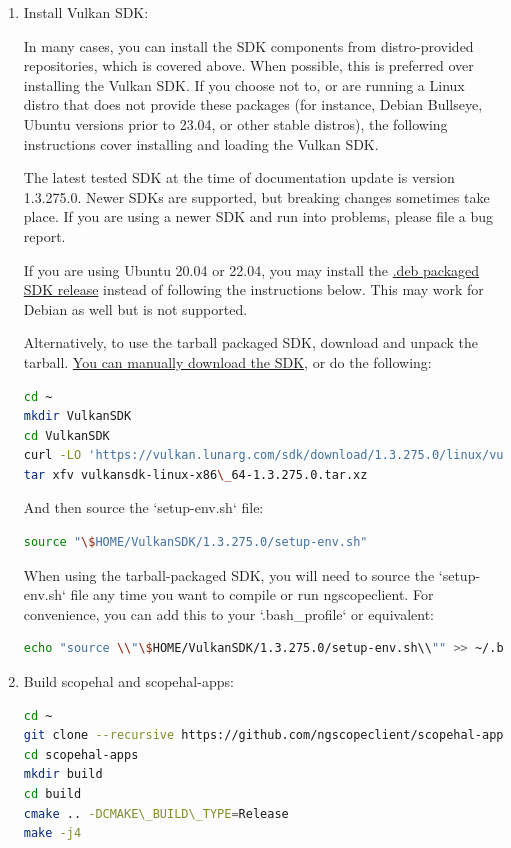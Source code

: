 \begin{enumerate}
\item Install Vulkan SDK:

In many cases, you can install the SDK components from distro-provided repositories, which is covered above. When
possible, this is preferred over installing the Vulkan SDK. If you choose not to, or are running a Linux distro that
does not provide these packages (for instance, Debian Bullseye, Ubuntu versions prior to 23.04, or other stable
distros), the following instructions cover installing and loading the Vulkan SDK.

The latest tested SDK at the time of documentation update is version 1.3.275.0. Newer SDKs are supported, but breaking
changes sometimes take place.
If you are using a newer SDK and run into problems, please file a bug report.

If you are using Ubuntu 20.04 or 22.04, you may install the
\href{https://packages.lunarg.com}{.deb packaged SDK release} instead of following the instructions below. This may
work for Debian as well but is not supported.

Alternatively, to use the tarball packaged SDK, download and unpack the tarball.
\href{https://vulkan.lunarg.com/sdk/home}{You can manually download the SDK}, or do the following:
\begin{lstlisting}[language=sh, numbers=none]
cd ~
mkdir VulkanSDK
cd VulkanSDK
curl -LO 'https://vulkan.lunarg.com/sdk/download/1.3.275.0/linux/vulkansdk-linux-x86\_64-1.3.275.0.tar.xz'
tar xfv vulkansdk-linux-x86\_64-1.3.275.0.tar.xz
\end{lstlisting}

And then source the `setup-env.sh` file:
\begin{lstlisting}[language=sh, numbers=none]
source "\$HOME/VulkanSDK/1.3.275.0/setup-env.sh"
\end{lstlisting}

When using the tarball-packaged SDK, you will need to source the `setup-env.sh` file any time you want to compile
or run ngscopeclient. For convenience, you can add this to your `.bash\_profile` or equivalent:
\begin{lstlisting}[language=sh, numbers=none]
echo "source \\"\$HOME/VulkanSDK/1.3.275.0/setup-env.sh\\"" >> ~/.bash\_profile
\end{lstlisting}

\item Build scopehal and scopehal-apps:

\begin{lstlisting}[language=sh, numbers=none]
cd ~
git clone --recursive https://github.com/ngscopeclient/scopehal-apps.git
cd scopehal-apps
mkdir build
cd build
cmake .. -DCMAKE\_BUILD\_TYPE=Release
make -j4
\end{lstlisting}

\end{enumerate}

